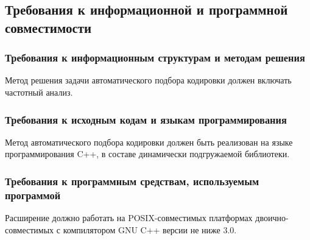 \documentclass[a4paper,10pt]{article}
\begin{document}
\subsection{Требования к информационной и программной совместимости}
\subsubsection{Требования к информационным структурам и методам решения}
Метод решения задачи автоматического подбора кодировки должен включать частотный анализ.

\subsubsection{Требования к исходным кодам и языкам программирования}
Метод автоматического подбора кодировки должен быть реализован на языке программирования C++,
в составе динамически подгружаемой библиотеки.

\subsubsection{Требования к программным средствам, используемым программой}
Расширение должно работать на POSIX-совместимых платформах двоично-совместимых с компилятором GNU C++ версии не ниже 3.0.

\end{document}
